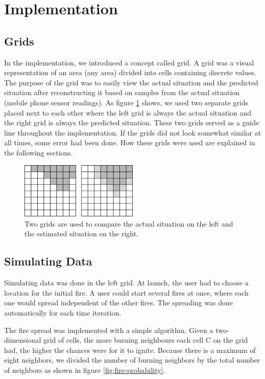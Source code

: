 \section{Implementation}
\subsection{Grids}
In the implementation, we introduced a concept called grid. A grid was a visual representation of an area (any area) divided into cells containing discrete values. The purpose of the grid was to easily view the actual situation and the predicted situation after reconstructing it based on samples from the actual situation (mobile phone sensor readings). As figure \ref{fig:grid-concept} shows, we used two separate grids placed next to each other where the left grid is always the actual situation and the right grid is always the predicted situation. These two grids served as a guide line throughout the implementation. If the grids did not look somewhat similar at all times, some error had been done. How these grids were used are explained in the following sections.

\begin{figure}[here]
\centering
\includegraphics[width=0.5\textwidth]{solution/graphics/grid-concept.png}
\caption{Two grids are used to compare the actual situation on the left and the estimated situation on the right.}
\label{fig:grid-concept}
\end{figure}

\subsection{Simulating Data}
Simulating data was done in the left grid. At launch, the user had to choose a location for the initial fire. A user could start several fires at once, where each one would spread independent of the other fires. The spreading was done automatically for each time iteration.

The fire spread was implemented with a simple algorithm. Given a two-dimensional grid of cells, the more burning neighbours each cell C on the grid had, the higher the chances were for it to ignite. Because there is a maximum of eight neighbors, we divided the number of burning neighbors by the total number of neighbors as shown in figure \ref{fig:fire-probability}.

